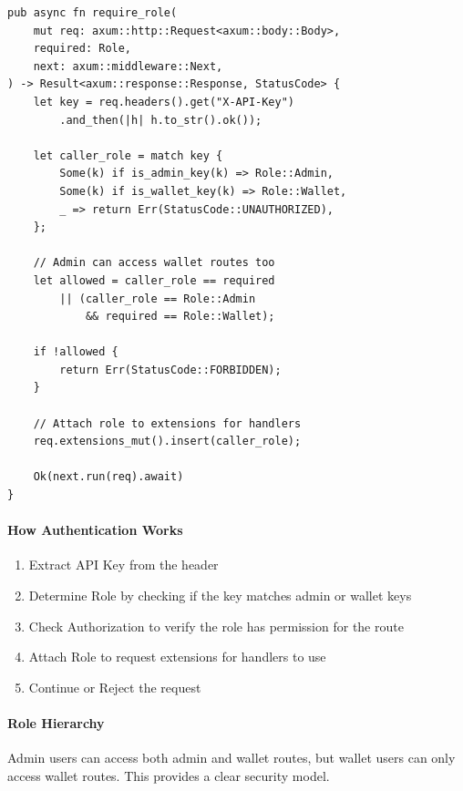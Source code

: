 \begin{listing}[htbp]
\caption{Role-based authentication middleware}
\label{lst:middleware-auth}
\begin{verbatim}
pub async fn require_role(
    mut req: axum::http::Request<axum::body::Body>,
    required: Role,
    next: axum::middleware::Next,
) -> Result<axum::response::Response, StatusCode> {
    let key = req.headers().get("X-API-Key")
        .and_then(|h| h.to_str().ok());

    let caller_role = match key {
        Some(k) if is_admin_key(k) => Role::Admin,
        Some(k) if is_wallet_key(k) => Role::Wallet,
        _ => return Err(StatusCode::UNAUTHORIZED),
    };

    // Admin can access wallet routes too
    let allowed = caller_role == required
        || (caller_role == Role::Admin
            && required == Role::Wallet);

    if !allowed {
        return Err(StatusCode::FORBIDDEN);
    }

    // Attach role to extensions for handlers
    req.extensions_mut().insert(caller_role);

    Ok(next.run(req).await)
}
\end{verbatim}
\end{listing}

\paragraph{How Authentication Works}

\begin{enumerate}
  \item Extract API Key from the  header
  \item Determine Role by checking if the key matches admin or wallet keys
  \item Check Authorization to verify the role has permission for the route
  \item Attach Role to request extensions for handlers to use
  \item Continue or Reject the request
\end{enumerate}

\paragraph{Role Hierarchy}

Admin users can access both admin and wallet routes, but wallet users can only access wallet routes. This provides a clear security model.

